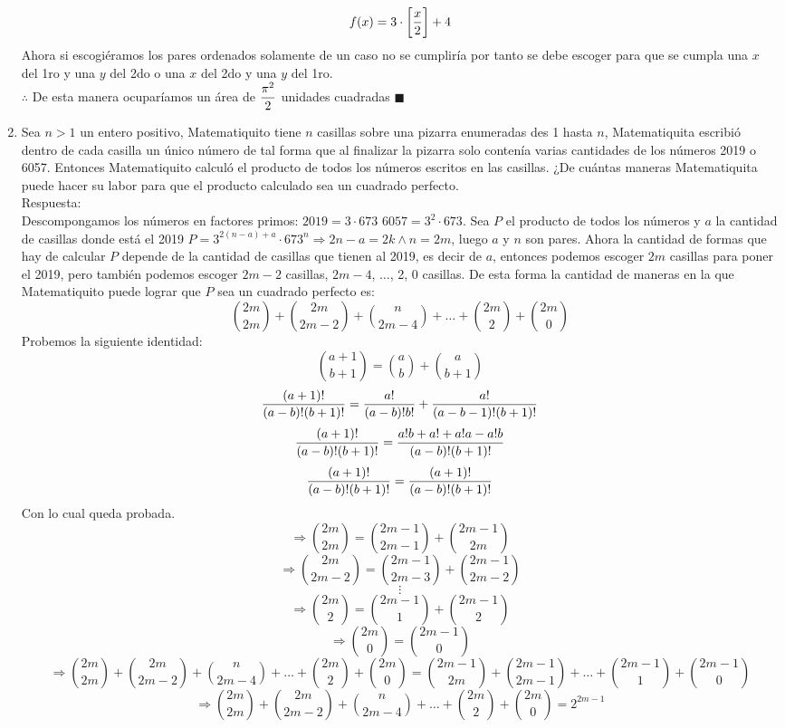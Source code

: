 \documentclass{book}
\begin{document}
\begin{enumerate}
$$f(x)=3\cdot\bigg[{x\over 2}\bigg]+4$$
Ahora si escogiéramos los pares ordenados solamente de un caso no se cumpliría por tanto se debe escoger para que se cumpla una $x$ del 1ro y una $y$ del 2do o una $x$ del 2do y una $y$ del 1ro. \\
$\therefore$ De esta manera ocuparíamos un área de $\displaystyle{\pi^2\over 2}$ unidades cuadradas $\blacksquare$\\
			\item Sea $n>1$ un entero positivo, Matematiquito tiene $n$ casillas sobre una pizarra enumeradas des 1 hasta $n$, Matematiquita escribió dentro de cada casilla un único número de tal forma que al finalizar la pizarra solo contenía varias cantidades de los números 2019 o 6057. Entonces Matematiquito calculó el producto de todos los números escritos en las casillas. ¿De cuántas maneras Matematiquita puede hacer su labor para que el producto calculado sea un cuadrado perfecto.\\
			Respuesta:\\
			Descompongamos los números en factores primos: $2019=3\cdot 673$ $6057=3^2\cdot 673$. Sea $P$ el producto de todos los números y $a$ la cantidad de casillas donde está el 2019 $P=3^{2(n-a)+a}\cdot  673^{n}\Rightarrow 2n-a=2k \wedge n=2m$, luego $a$ y $n$ son pares. Ahora la cantidad de formas que hay de calcular $P$ depende de la cantidad de casillas que tienen al 2019, es decir de $a$, entonces podemos escoger $2m$ casillas para poner el 2019, pero también podemos escoger $2m-2$ casillas, $2m-4$, $\ldots$, 2, 0 casillas. De esta forma la cantidad de maneras en la que Matematiquito puede lograr que $P$ sea un cuadrado perfecto es:
			$${2m \choose 2m}+{2m \choose 2m-2}+{n \choose 2m-4}+\ldots+{2m \choose 2}+{2m \choose 0}$$ 
			Probemos la siguiente identidad:
			$${a+1 \choose b+1}={a \choose b}+{a \choose b+1}$$
			$${(a+1)!\over (a-b)!(b+1)!}={a!\over (a-b)!b!}+{a!\over (a-b-1)!(b+1)!}$$
			$${(a+1)!\over (a-b)!(b+1)!}=\frac{a!b+a!+a!a-a!b}{(a-b)!(b+1)!}$$
			$${(a+1)!\over (a-b)!(b+1)!}={(a+1)!\over (a-b)!(b+1)!}$$
			Con lo cual queda probada.
			$$\Rightarrow {2m \choose 2m}={2m-1 \choose 2m-1}+{2m-1 \choose 2m}$$
			$$\Rightarrow {2m \choose 2m-2}={2m-1 \choose 2m-3}+{2m-1 \choose 2m-2}$$
			$$\vdots$$
			$$\Rightarrow {2m \choose 2}={2m-1 \choose 1}+{2m-1 \choose 2}$$
			$$\Rightarrow{2m \choose 0}={2m-1 \choose 0}$$
			$$\Rightarrow {2m \choose 2m}+{2m \choose 2m-2}+{n \choose 2m-4}+\ldots+{2m \choose 2}+{2m \choose 0}={2m-1 \choose 2m}+{2m-1 \choose 2m-1}+\ldots +{2m-1 \choose 1}+{2m-1 \choose 0}$$
			$$\Rightarrow {2m \choose 2m}+{2m \choose 2m-2}+{n \choose 2m-4}+\ldots+{2m \choose 2}+{2m \choose 0}=2^{2m-1}$$

\end{enumerate}
\end{document}
